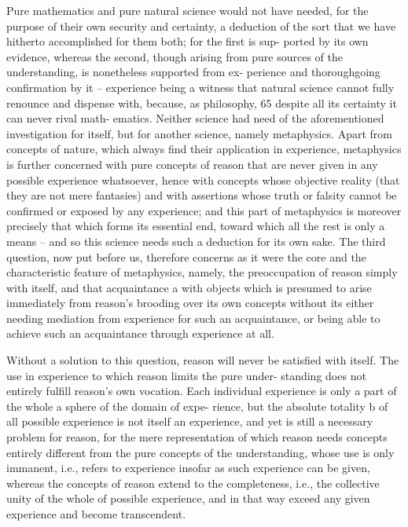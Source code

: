 Pure mathematics and pure natural science would not have needed, for
the purpose of their own security and certainty, a deduction of the sort
that we have hitherto accomplished for them both; for the ﬁrst is sup-
ported by its own evidence, whereas the second, though arising from
pure sources of the understanding, is nonetheless supported from ex-
perience and thoroughgoing conﬁrmation by it – experience being a
witness that natural science cannot fully renounce and dispense with,
because, as philosophy, 65 despite all its certainty it can never rival math-
ematics. Neither science had need of the aforementioned investigation
for itself, but for another science, namely metaphysics.
Apart from concepts of nature, which always ﬁnd their application
in experience, metaphysics is further concerned with pure concepts
of reason that are never given in any possible experience whatsoever,
hence with concepts whose objective reality (that they are not mere
fantasies) and with assertions whose truth or falsity cannot be conﬁrmed
or exposed by any experience; and this part of metaphysics is moreover
precisely that which forms its essential end, toward which all the rest
is only a means – and so this science needs such a deduction for its own
sake. The third question, now put before us, therefore concerns as it
were the core and the characteristic feature of metaphysics, namely,
the preoccupation of reason simply with itself, and that acquaintance a
with objects which is presumed to arise immediately from reason’s
brooding over its own concepts without its either needing mediation
from experience for such an acquaintance, or being able to achieve such
an acquaintance through experience at all.

Without a solution to this question, reason will never be satisﬁed
with itself. The use in experience to which reason limits the pure under-
standing does not entirely fulﬁll reason’s own vocation. Each individual
experience is only a part of the whole a sphere of the domain of expe-
rience, but the absolute totality b of all possible experience is not itself an
experience, and yet is still a necessary problem for reason, for the mere
representation of which reason needs concepts entirely different from
the pure concepts of the understanding, whose use is only immanent, i.e.,
refers to experience insofar as such experience can be given, whereas the
concepts of reason extend to the completeness, i.e., the collective unity
of the whole of possible experience, and in that way exceed any given
experience and become transcendent.

